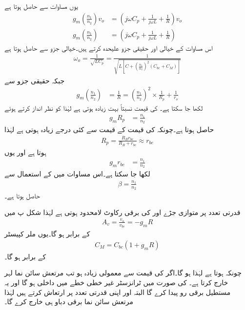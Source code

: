یوں مساوات  سے حاصل ہوتا ہے 
\begin{align*}
g_m \left(\frac{n_1}{n_2} \right) v_o &=\left(j \omega C_p +\frac{1}{j \omega L} +\frac{1}{R} \right) v_o\\
g_m \left(\frac{n_1}{n_2} \right) &=\left(j \omega C_p +\frac{1}{j \omega L} +\frac{1}{R} \right)
\end{align*}
اس مساوات کے خیالی اور حقیقی جزو علیحدہ کرتے ہیں۔خیالی جزو سے حاصل ہوتا ہے
\begin{align}
\omega_o=\frac{1}{\sqrt{L C_p}}=\frac{1}{\sqrt{L \left[C+\left(\frac{n_1}{n_2}\right)^2 \left(C_{be}+C_M \right) \right]}}
\end{align}
جبکہ حقیقی جزو سے
\begin{align*}
g_m \left ( \frac{n_1}{n_2}\right)&=\frac{1}{R}=\left(\frac{n_1}{n_2} \right)^2  \times \frac{1}{R_p} +\frac{1}{r_o}
\end{align*}
لکھا جا سکتا ہے۔ کی قیمت نسبتاً بہت زیادہ ہوتی ہے لہٰذا  کو نظر انداز کرتے ہوئے
\begin{align*}
g_m R_p&=\frac{n_1}{n_2}
\end{align*}
حاصل ہوتا ہے۔چونکہ  کی قیمت  کے قیمت سے کئی درجے زیادہ ہوتی ہے لہٰذا
\begin{align*}
R_p=\frac{R_B r_{be}}{R_B+r_{be}} \approx r_{be}
\end{align*}
ہوتا ہے  اور یوں
\begin{align*}
g_m r_{be}&=\frac{n_1}{n_2}
\end{align*}
لکھا جا سکتا ہے۔اس مساوات میں  کے استعمال سے
\begin{align}
\beta = \frac{n_1}{n_2}
\end{align}
حاصل ہوتا ہے۔

قدرتی تعدد  پر متوازی جڑے  اور  کی برقی رکاوٹ لامحدود ہوتی ہے لہٰذا شکل  پ میں
\begin{align}
A_v=\frac{v_o}{v_{be}}=- g_m R 
\end{align}
کے برابر ہو گا۔یوں ملر کپیسٹر
\begin{align*}
C_M=C_{bc} \left(1+g_m R \right)
\end{align*}
کے برابر ہو گا۔

چونکہ  ہوتا ہے لہٰذا  ہو گا۔اگر  کی قیمت  سے معمولی زیادہ ہو تب مرتعش سائن نما لہر خارج کرتا ہے۔ کی صورت میں ٹرانزسٹر غیر خطی خطے میں داخلی ہو گا اور یہ مستطیل برقی رو پیدا کرے گا البتہ  اور  اپنی قدرتی تعدد  پر ارتعاش کرتے ہیں لہٰذا مرتعش سائن نما برقی دباو  ہی خارج کرے گا۔

